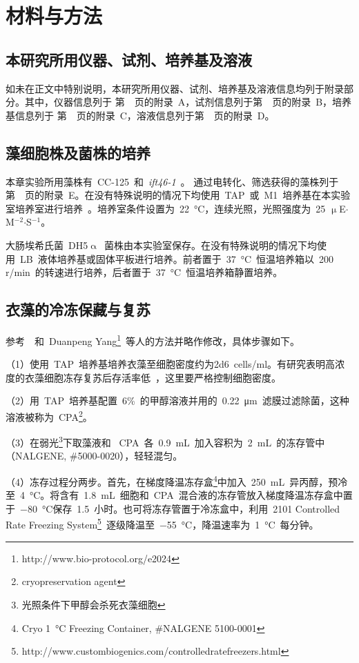 \section{材料与方法}
\subsection{本研究所用仪器、试剂、培养基及溶液}
如未在正文中特别说明，本研究所用仪器、试剂、培养基及溶液信息均列于附录部分。其中，仪器信息列于
第\ \pageref{appen:A}\ 页的附录\ A，试剂信息列于第\ \pageref{appen:B}\ 页的附录\ B，培养基信息列于
第\ \pageref{appen:C}\ 页的附录\ C，溶液信息列于第\ \pageref{appen:D}\ 页的附录\ D。
\subsection{藻细胞株及菌株的培养}\label{subsec:algae}
本章实验所用藻株有\ CC-125\
和\ \textit{ift46-1}\ \citep{Hou2007}。 通过电转化、筛选获得的藻株列于第\ \pageref{appen:E}\ 页的附录\ E。在没有特殊说明的情况下均使用\ TAP\ 或\ M1\ 培养基在本实验室培养室进行培养\
\citep{Harris1989,Sager1953}。培养室条件设置为\ \SI{22}{\degreeCelsius}，连续光照，光照强度为\
25 $\upmu$E$\cdot$M$^{-2}$$\cdot$S$^{-1}$。

大肠埃希氏菌\index{大肠杆菌}\ DH5$\upalpha$\ 菌株由本实验室保存。在没有特殊说明的情况下均使用\ LB\ 液体培养基或固体平板进行培养。前者置于\ \SI{37}{\degreeCelsius}\ 恒温培养箱以\ 200 r/min\ 的转速进行培养，后者置于\ \SI{37}{\degreeCelsius}\ 恒温培养箱静置培养。

\subsection{衣藻的冷冻保藏与复苏}
参考\ \citet{Crutchfield1999}\ 和\ Duanpeng Yang\footnote{http://www.bio-protocol.org/e2024}\ 等人的方法并略作修改，具体步骤如下。

（1）使用\ TAP\ 培养基培养衣藻至细胞密度约为\num{2d6}\ cells/ml。有研究表明高浓度的衣藻细胞冻存复苏后存活率低\ \citep{Piasecki2009}，这里要严格控制细胞密度。

（2）用\ TAP\ 培养基配置\ 6\%\ 的甲醇溶液并用的\ \SI{0.22}{\um}\ 滤膜过滤除菌，这种溶液被称为\ CPA\footnote{cryopreservation agent}。

（3）在弱光\footnote{光照条件下甲醇会杀死衣藻细胞}下取藻液和 \ CPA\ 各\ \SI{0.9}{\mL}\ 加入容积为\ \SI{2}{\mL}\ 的冻存管中（NALGENE, \#5000-0020），轻轻混匀。

（4）冻存过程分两步。首先，在梯度降温冻存盒\footnote{Cryo \SI{1}{\degreeCelsius} Freezing Container, \#NALGENE 5100-0001}中加入\ \SI{250}{\mL}\ 异丙醇，预冷至\ \SI{4}{\degreeCelsius}。将含有\ \SI{1.8}{\mL}\ 细胞和\ CPA\ 混合液的冻存管放入梯度降温冻存盒中置于\ \SI{-80}{\degreeCelsius}保存\ 1.5\ 小时。也可将冻存管置于冷冻盒中，利用\ 2101 Controlled Rate Freezing System\footnote{ http://www.custombiogenics.com/controlledratefreezers.html }\ 逐级降温至\ \SI{-55}{\degreeCelsius}，降温速率为\ \SI{1}{\degreeCelsius}\ 每分钟。


